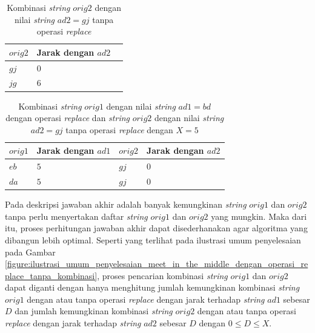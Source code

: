 \begin{table}
	\centering
	\begin{tabular}{|l|l|l|} \hline
		$ orig2 $ & Jarak dengan $ ad2 $\\ \hline
		$gj$ & $0$ \\ \hline
		$jg$ & $6$ \\ \hline
	\end{tabular}
	\caption{Kombinasi \textit{string} $orig2$ dengan nilai \textit{string} $ ad2=gj $ tanpa operasi \textit{replace}}
	\label{tab:kombinasi_orig2_gj_tanpa_replace}
\end{table}

\begin{table}
	\centering
	\begin{tabular}{|l|l|l|l|} \hline
		$ orig1 $ & Jarak dengan $ ad1 $ & $ orig2 $ & Jarak dengan $ ad2 $\\ \hline
		$eb$ & $5$ & $gj$ & $0$\\ \hline
		$da$ & $5$ & $gj$ & $0$\\ \hline
	\end{tabular}
	\caption{Kombinasi \textit{string} $orig1$ dengan nilai \textit{string} $ ad1=bd $ dengan operasi \textit{replace} dan  \textit{string} $orig2$ dengan nilai \textit{string} $ ad2=gj $ tanpa operasi \textit{replace} dengan $ X=5 $}
	\label{tab:kombinasi_orig1_bd_dengan_replace_dan_orig2_gj_tanpa_replace}
\end{table}

Pada deskripsi \problem{} jawaban akhir adalah banyak kemungkinan \textit{string} $ orig1 $ dan $ orig2 $ tanpa perlu menyertakan daftar \textit{string} $ orig1 $ dan $ orig2 $ yang mungkin. Maka dari itu, proses perhitungan jawaban akhir dapat disederhanakan agar algoritma yang dibangun lebih optimal. Seperti yang terlihat pada ilustrasi umum penyelesaian pada Gambar \ref{figure:ilustrasi_umum_penyelesaian_meet_in_the_middle_dengan_operasi_replace_tanpa_kombinasi}, proses pencarian kombinasi \textit{string} $ orig1 $ dan $ orig2 $ dapat diganti dengan hanya menghitung jumlah kemungkinan kombinasi \textit{string} $ orig1 $ dengan atau tanpa operasi \textit{replace} dengan jarak terhadap \textit{string} $ ad1 $ sebesar $ D $ dan jumlah kemungkinan kombinasi \textit{string} $ orig2 $ dengan atau tanpa operasi \textit{replace} dengan jarak terhadap \textit{string} $ ad2 $ sebesar $ D $ dengan $ 0 \le D \le X $.

